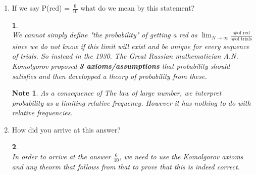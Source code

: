 \documentclass[11pt]{article}
\newtheorem*{note}{Note}
\newtheorem*{solution}{\framebox{Sol}}
\newcommand\tab[1][1cm]{\hspace*{#1}}
\begin{document}
                \begin{enumerate}
                    \item If we say P(red) = $\frac{6}{10}$ what do we mean by this statement?
                        \begin{solution}\tab \\
                            We cannot simply define "the probability" of getting a red as 
                            $\lim_{N \rightarrow \infty} \frac{\text{\# of red}}{\text{\# of trials}}$
                            since we do not know if this limit will exist and be unique for every sequence of trials.
                            So instead in the 1930. The Great Russian mathematician A.N. Komolgorov proposed \textbf{3 axioms/assumptions}
                            that probability should satisfies and then developped a theory of probability from these.
                        \end{solution}
                        \begin{note}
                            As a consequence of The law of large number, we interpret probability as a limiting relative frequency.
                            However it has nothing to do with relative frequencies.
                        \end{note}
                        
                    \item How did you arrive at this answer?
                        \begin{solution} \tab \\
                            In order to arrive at the answer $\frac{6}{10}$, we need to use the Komolgorov axioms
                            and any theorm that follows from that to prove that this is indeed correct.
                        \end{solution}
                \end{enumerate}
\end{document}
